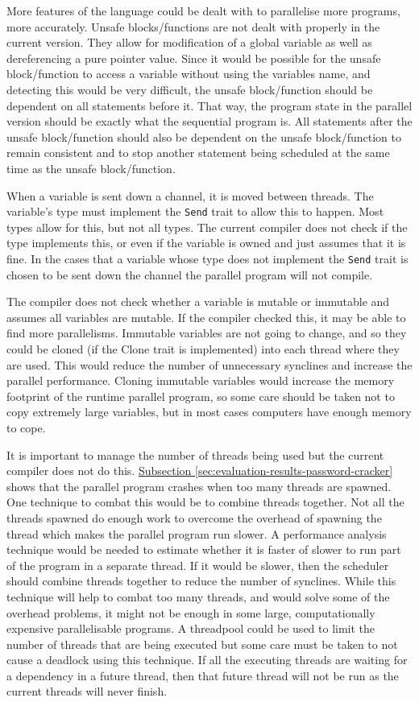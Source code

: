 More features of the language could be dealt with to parallelise more programs, more accurately. Unsafe blocks/functions are not dealt with properly in the current version. They allow for modification of a global variable as well as dereferencing a pure pointer value. Since it would be possible for the unsafe block/function to access a variable without using the variables name, and detecting this would be very difficult, the unsafe block/function should be dependent on all statements before it. That way, the program state in the parallel version should be exactly what the sequential program is. All statements after the unsafe block/function should also be dependent on the unsafe block/function to remain consistent and to stop another statement being scheduled at the same time as the unsafe block/function.

When a variable is sent down a channel, it is moved between threads. The variable's type must implement the \texttt{Send} trait to allow this to happen. Most types allow for this, but not all types. The current compiler does not check if the type implements this, or even if the variable is owned and just assumes that it is fine. In the cases that a variable whose type does not implement the \texttt{Send} trait is chosen to be sent down the channel the parallel program will not compile.

The compiler does not check whether a variable is mutable or immutable and assumes all variables are mutable. If the compiler checked this, it may be able to find more parallelisms. Immutable variables are not going to change, and so they could be cloned (if the Clone trait is implemented) into each thread where they are used. This would reduce the number of unnecessary synclines and increase the parallel performance. Cloning immutable variables would increase the memory footprint of the runtime parallel program, so some care should be taken not to copy extremely large variables, but in most cases computers have enough memory to cope.

It is important to manage the number of threads being used but the current compiler does not do this. \hyperref[sec:evaluation-results-password-cracker]{Subsection \ref{sec:evaluation-results-password-cracker}} shows that the parallel program crashes when too many threads are spawned. One technique to combat this would be to combine threads together. Not all the threads spawned do enough work to overcome the overhead of spawning the thread which makes the parallel program run slower. A performance analysis technique would be needed to estimate whether it is faster of slower to run part of the program in a separate thread. If it would be slower, then the scheduler should combine threads together to reduce the number of synclines. While this technique will help to combat too many threads, and would solve some of the overhead problems, it might not be enough in some large, computationally expensive parallelisable programs. A threadpool could be used to limit the number of threads that are being executed but some care must be taken to not cause a deadlock using this technique. If all the executing threads are waiting for a dependency in a future thread, then that future thread will not be run as the current threads will never finish.

